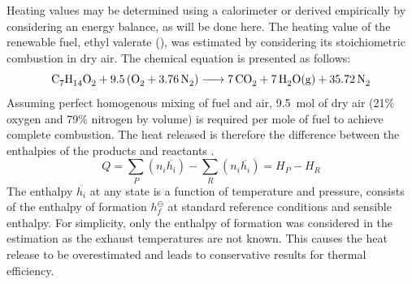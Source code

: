 \documentclass[11pt]{article}
\begin{document}
Heating values may be determined using a calorimeter or derived empirically by considering an energy balance, as will be done here. The heating value of the renewable fuel, ethyl valerate (), was estimated by considering its stoichiometric combustion in dry air. The chemical equation is presented as follows: 
\begin{equation}
    \ce{C7H14O2 + 9.5(O2 + 3.76N2) -> 7CO2 + 7H2O(g) + 35.72N2} \label{q3-1}
\end{equation}
Assuming perfect homogenous mixing of fuel and air, \SI{9.5}{\mol} of dry air (21\% oxygen and 79\% nitrogen by volume) is required per mole of fuel to achieve complete combustion. The heat released is therefore the difference between the enthalpies of the products and reactants \cite{q3-r2}.
\begin{equation}
    Q = \sum_P \left(n_i\overline{h_i}\right) - \sum_R \left(n_i\overline{h_i}\right) = H_P - H_R \label{q3-2}
\end{equation}
The enthalpy $\overline{h_i}$ at any state is a function of temperature and pressure, consists of the enthalpy of formation $h_f^{\ominus}$ at standard reference conditions and sensible enthalpy. For simplicity, only the enthalpy of formation was considered in the estimation as the exhaust temperatures are not known. This causes the heat release to be overestimated and leads to conservative results for thermal efficiency. 
\end{document}
